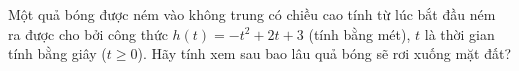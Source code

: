 \begin{ex}
Một quả bóng được ném vào không trung có chiều cao tính từ lúc bắt đầu ném ra được cho bởi công thức $h(t)=-t^2+2t+3$ (tính bằng mét), $t$ là thời gian tính bằng giây ($t\ge0$). Hãy tính xem sau bao lâu quả bóng sẽ rơi xuống mặt đất?
\end{ex}
